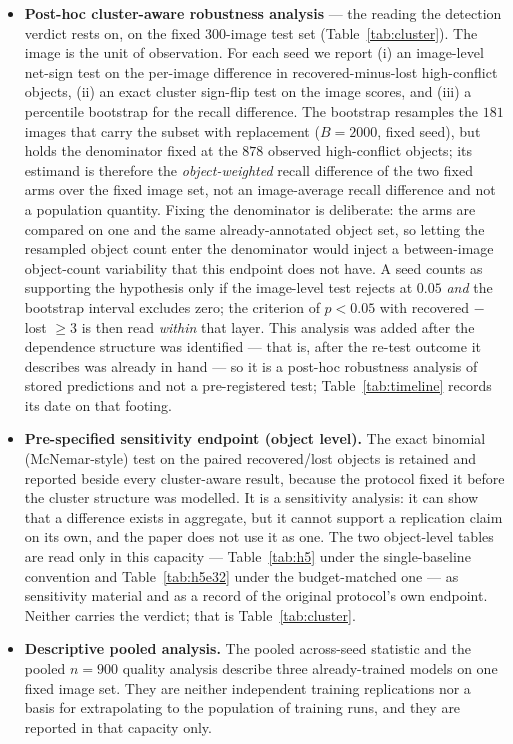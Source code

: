 \documentclass[pdflatex,sn-mathphys-num]{sn-jnl}
\theoremstyle{thmstyleone}%
\theoremstyle{thmstyletwo}%
\theoremstyle{thmstylethree}%
\begin{document}
\begin{itemize}
\item \textbf{Post-hoc cluster-aware robustness analysis} --- the reading the detection verdict rests on, on the fixed 300-image test set (Table~\ref{tab:cluster}). The image is the unit of observation. For each seed we report (i) an image-level net-sign test on the per-image difference in recovered-minus-lost high-conflict objects, (ii) an exact cluster sign-flip test on the image scores, and (iii) a percentile bootstrap for the recall difference. The bootstrap resamples the $181$ images that carry the subset with replacement ($B = 2000$, fixed seed), but holds the denominator fixed at the $878$ observed high-conflict objects; its estimand is therefore the \emph{object-weighted} recall difference of the two fixed arms over the fixed image set, not an image-average recall difference and not a population quantity. Fixing the denominator is deliberate: the arms are compared on one and the same already-annotated object set, so letting the resampled object count enter the denominator would inject a between-image object-count variability that this endpoint does not have. A seed counts as supporting the hypothesis only if the image-level test rejects at $0.05$ \emph{and} the bootstrap interval excludes zero; the criterion of $p<0.05$ with recovered $-$ lost $\geq 3$ is then read \emph{within} that layer. This analysis was added after the dependence structure was identified --- that is, after the re-test outcome it describes was already in hand --- so it is a post-hoc robustness analysis of stored predictions and not a pre-registered test; Table~\ref{tab:timeline} records its date on that footing.
\item \textbf{Pre-specified sensitivity endpoint (object level).} The exact binomial (McNemar-style) test on the paired recovered/lost objects is retained and reported beside every cluster-aware result, because the protocol fixed it before the cluster structure was modelled. It is a sensitivity analysis: it can show that a difference exists in aggregate, but it cannot support a replication claim on its own, and the paper does not use it as one. The two object-level tables are read only in this capacity --- Table~\ref{tab:h5} under the single-baseline convention and Table~\ref{tab:h5e32} under the budget-matched one --- as sensitivity material and as a record of the original protocol's own endpoint. Neither carries the verdict; that is Table~\ref{tab:cluster}.
\item \textbf{Descriptive pooled analysis.} The pooled across-seed statistic and the pooled $n=900$ quality analysis describe three already-trained models on one fixed image set. They are neither independent training replications nor a basis for extrapolating to the population of training runs, and they are reported in that capacity only.
\end{itemize}
\end{document}
